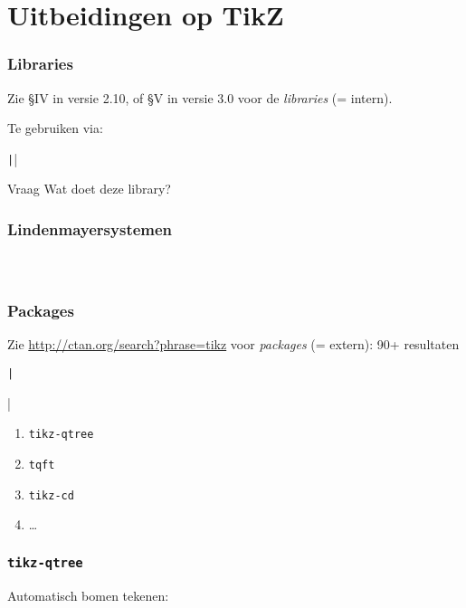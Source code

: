 \section{Uitbeidingen op TikZ}

\begin{frame}
  \frametitle{Libraries}

  Zie \S IV in versie 2.10, of \S V in versie 3.0 voor de \emph{libraries} (= intern).

  \pause
  Te gebruiken via:
  
  \texttt|\usetikzlibrary{lindenmayersystems}|

  \begin{alertblock}{Vraag}
    Wat doet deze library?
  \end{alertblock}
\end{frame}

\begin{frame}
  \frametitle{Lindenmayersystemen}

  \begin{columns}
    \begin{column}{.6\textwidth}
      \inputminted[fontsize = \scriptsize]{latex}{tikz/l-system.tikz}
    \end{column}
    \begin{column}{.4\textwidth}
      
    \end{column}
  \end{columns}
\end{frame}

\begin{frame}
  \frametitle{Packages}

  Zie \url{http://ctan.org/search?phrase=tikz} voor \emph{packages} (= extern): 90+ resultaten

  \texttt|\usepackage{...}|

  \pause
  \begin{enumerate}
    \item \texttt{tikz-qtree}
    \item \texttt{tqft}
    \item \texttt{tikz-cd}
    \item \ldots
  \end{enumerate}
\end{frame}

\begin{frame}
  \frametitle{\texttt{tikz-qtree}}
  
  Automatisch bomen tekenen:
  \begin{columns}
    \begin{column}{.6\textwidth}
      \inputminted[fontsize = \scriptsize]{latex}{tikz/tikz-qtree.tikz}
    \end{column}
    \begin{column}{.4\textwidth}
      
    \end{column}
  \end{columns}
\end{frame}

